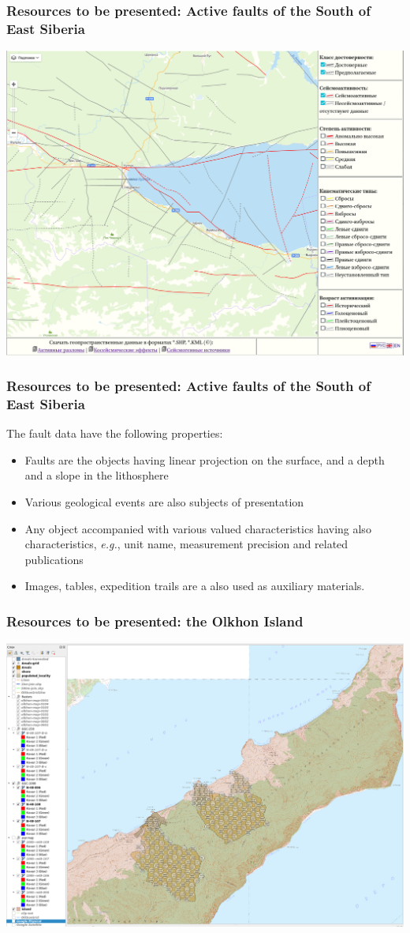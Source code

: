 \documentclass[10pt]{beamer}
\begin{document}
\begin{frame}
  \frametitle{Resources to be presented: Active faults of the South of
    East Siberia}
  \centering
   \includegraphics[width=0.9\linewidth]{activetectonics.png}
\end{frame}

\begin{frame}
  \frametitle{Resources to be presented: Active faults of the South of
    East Siberia}
  The fault data have the following properties:
  \begin{itemize}
  \item Faults are the objects having linear projection on the surface, and a depth and a slope in the lithosphere
  \item Various geological events are also subjects of presentation
  \item Any object accompanied with various valued characteristics having also characteristics, \emph{e.g.}, unit name, measurement precision and related publications
  \item Images, tables, expedition trails are a also used as auxiliary materials.
  \end{itemize}
\end{frame}

\begin{frame}
  \frametitle{Resources to be presented:  the Olkhon Island}
  \centering
   \includegraphics[width=\linewidth]{olkhon-gis.png}
\end{frame}
\end{document}
